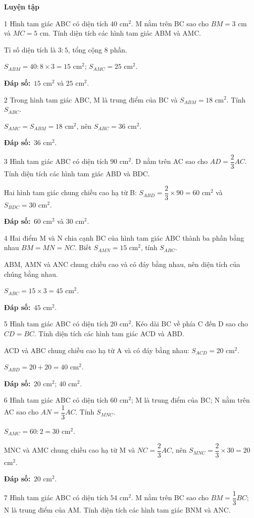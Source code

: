 \documentclass[11pt]{article}
\newif\ifsol \solfalse
\providecommand{\AnsWord}{Đáp số}
\newcommand{\dapso}[1]{\par\textbf{\AnsWord:}\ #1}
\newcommand{\probsol}[1]{%
  \begin{lrbox}{\solmeasure}\begin{minipage}{\dimexpr\linewidth-24pt\relax}#1\end{minipage}\end{lrbox}%
  \ifsol
    \begin{solbox}#1\end{solbox}%
  \else
    \setlength{\solht}{\dimexpr\ht\solmeasure+\dp\solmeasure+0.85cm\relax}%
    \ifdim\solht<1.35cm\setlength{\solht}{1.35cm}\fi
    \begin{tcolorbox}[colback=white,colframe=Line,boxrule=0.8pt,arc=5pt,
      left=8pt,right=8pt,top=4pt,bottom=4pt,height=\solht]{\footnotesize\color{Slate}\itshape\WorkWord}\end{tcolorbox}%
  \fi}
\newcommand{\dividerbar}[1]{\par\vspace{0.6em}\noindent
  \begin{tcolorbox}[enhanced,frame hidden,interior hidden,borderline west={5pt}{0pt}{ProbBlue},
    colback=white,left=12pt,right=12pt,top=5pt,bottom=5pt,arc=4pt]
  {\large\bfseries\color{ProbBlue} #1}\end{tcolorbox}\vspace{0.4em}}
\newcommand{\gap}{\vspace{0.3cm}}
\def\WorkWord{Bài làm:}
\def\AnsWord{Đáp số}
\begin{document}
\dividerbar{Luyện tập}
\begin{probbox}{1}{\relax}
Hình tam giác ABC có diện tích $40$ cm$^2$. M nằm trên BC sao cho $BM=3$ cm và $MC=5$ cm. Tính diện tích các hình tam giác ABM và AMC.
\end{probbox}
\probsol{
Tỉ số diện tích là $3:5$, tổng cộng $8$ phần.\par $S_{ABM}=40:8\times3=15$ cm$^2$; $S_{AMC}=25$ cm$^2$.
\dapso{$15$ cm$^2$ và $25$ cm$^2$.}}
\gap
\begin{probbox}{2}{\relax}
Trong hình tam giác ABC, M là trung điểm của BC và $S_{ABM}=18$ cm$^2$. Tính $S_{ABC}$.
\end{probbox}
\probsol{
$S_{AMC}=S_{ABM}=18$ cm$^2$, nên $S_{ABC}=36$ cm$^2$.
\dapso{$36$ cm$^2$.}}
\gap
\begin{probbox}{3}{\relax}
Hình tam giác ABC có diện tích $90$ cm$^2$. D nằm trên AC sao cho $AD=\dfrac23AC$. Tính diện tích các hình tam giác ABD và BDC.
\end{probbox}
\probsol{
Hai hình tam giác chung chiều cao hạ từ B: $S_{ABD}=\dfrac23\times90=60$ cm$^2$ và $S_{BDC}=30$ cm$^2$.
\dapso{$60$ cm$^2$ và $30$ cm$^2$.}}
\gap
\begin{probbox}{4}{\relax}
Hai điểm M và N chia cạnh BC của hình tam giác ABC thành ba phần bằng nhau $BM=MN=NC$. Biết $S_{AMN}=15$ cm$^2$, tính $S_{ABC}$.
\end{probbox}
\probsol{
ABM, AMN và ANC chung chiều cao và có đáy bằng nhau, nên diện tích của chúng bằng nhau.\par $S_{ABC}=15\times3=45$ cm$^2$.
\dapso{$45$ cm$^2$.}}
\gap
\begin{probbox}{5}{\relax}
Hình tam giác ABC có diện tích $20$ cm$^2$. Kéo dài BC về phía C đến D sao cho $CD=BC$. Tính diện tích các hình tam giác ACD và ABD.
\end{probbox}
\probsol{
ACD và ABC chung chiều cao hạ từ A và có đáy bằng nhau: $S_{ACD}=20$ cm$^2$.\par $S_{ABD}=20+20=40$ cm$^2$.
\dapso{$20$ cm$^2$; $40$ cm$^2$.}}
\gap
\begin{probbox}{6}{\relax}
Hình tam giác ABC có diện tích $60$ cm$^2$; M là trung điểm của BC; N nằm trên AC sao cho $AN=\dfrac13AC$. Tính $S_{MNC}$.
\end{probbox}
\probsol{
$S_{AMC}=60:2=30$ cm$^2$.\par MNC và AMC chung chiều cao hạ từ M và $NC=\dfrac23AC$, nên $S_{MNC}=\dfrac23\times30=20$ cm$^2$.
\dapso{$20$ cm$^2$.}}
\gap
\begin{probbox}{7}{\relax}
Hình tam giác ABC có diện tích $54$ cm$^2$. M nằm trên BC sao cho $BM=\dfrac13BC$; N là trung điểm của AM. Tính diện tích các hình tam giác BNM và ANC.
\end{probbox}
\end{document}
